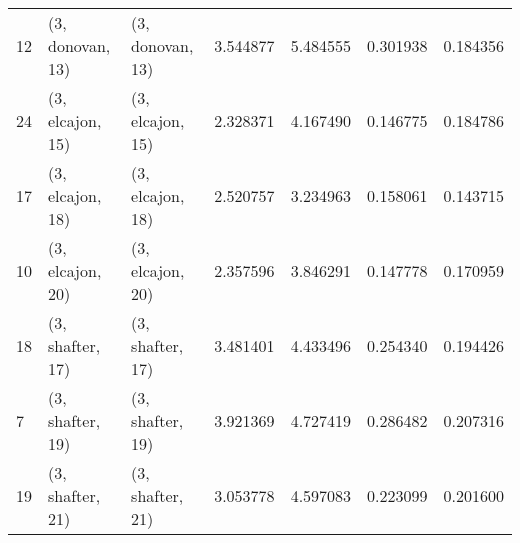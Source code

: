 \begin{tabular}{lllrrrr}
12 &  (3, donovan, 13) &  (3, donovan, 13) &  3.544877 &  5.484555 &   0.301938 &  0.184356 \\
24 &  (3, elcajon, 15) &  (3, elcajon, 15) &  2.328371 &  4.167490 &   0.146775 &  0.184786 \\
17 &  (3, elcajon, 18) &  (3, elcajon, 18) &  2.520757 &  3.234963 &   0.158061 &  0.143715 \\
10 &  (3, elcajon, 20) &  (3, elcajon, 20) &  2.357596 &  3.846291 &   0.147778 &  0.170959 \\
18 &  (3, shafter, 17) &  (3, shafter, 17) &  3.481401 &  4.433496 &   0.254340 &  0.194426 \\
7  &  (3, shafter, 19) &  (3, shafter, 19) &  3.921369 &  4.727419 &   0.286482 &  0.207316 \\
19 &  (3, shafter, 21) &  (3, shafter, 21) &  3.053778 &  4.597083 &   0.223099 &  0.201600 \\
\bottomrule
\end{tabular}
